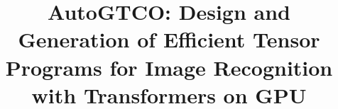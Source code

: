 \documentclass[10pt,conference]{IEEEtran}
\begin{document}
\title{
    AutoGTCO: Design and Generation of Efficient Tensor Programs for Image Recognition with Transformers on GPU
}

\iffalse
\author{
    Yang Bai$^1$, \quad
    Bei Yu$^1$ \\
    $^1$The Chinese University of Hong Kong \qquad
    {\tt\small \{ybai,byu\}@cse.cuhk.edu.hk}
}
\fi


\maketitle











{


}
\end{document}
